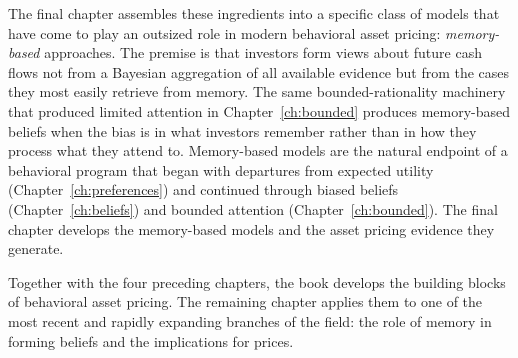 The final chapter assembles these ingredients into a specific class of models that have come to play an outsized role in modern behavioral asset pricing: \emph{memory-based} approaches. The premise is that investors form views about future cash flows not from a Bayesian aggregation of all available evidence but from the cases they most easily retrieve from memory. The same bounded-rationality machinery that produced limited attention in Chapter~\ref{ch:bounded} produces memory-based beliefs when the bias is in what investors remember rather than in how they process what they attend to. Memory-based models are the natural endpoint of a behavioral program that began with departures from expected utility (Chapter~\ref{ch:preferences}) and continued through biased beliefs (Chapter~\ref{ch:beliefs}) and bounded attention (Chapter~\ref{ch:bounded}). The final chapter develops the memory-based models and the asset pricing evidence they generate.

Together with the four preceding chapters, the book develops the building blocks of behavioral asset pricing. The remaining chapter applies them to one of the most recent and rapidly expanding branches of the field: the role of memory in forming beliefs and the implications for prices.